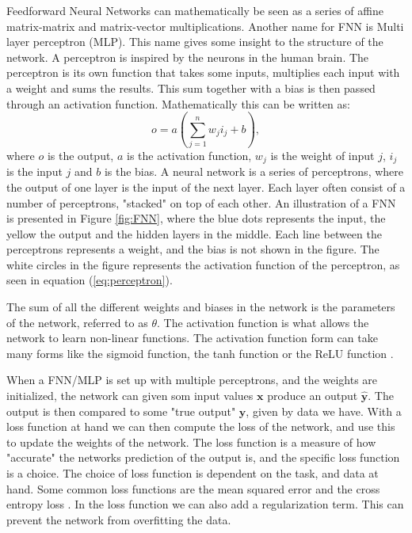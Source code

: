 Feedforward Neural Networks can mathematically be seen as a series of 
affine matrix-matrix and matrix-vector multiplications. Another name for FNN is
Multi layer perceptron (MLP). This name gives some insight to the structure of the
network. A perceptron is inspired by the neurons in the human brain. The perceptron
is its own function that takes some inputs, multiplies each input with a weight and
sums the results. This sum together with a bias is then passed through an activation function.
Mathematically this can be written as:
\begin{equation}
    o = a(\sum_{j=1}^{n} w_j i_j + b),
    \label{eq:perceptron}
\end{equation}
where $o$ is the output, $a$ is the activation function, $w_j$ is the weight of input $j$, $i_j$ is the input $j$ and $b$ is the bias.
A neural network is a series of perceptrons, where the output of one layer is the input of the next layer.
Each layer often consist of a number of perceptrons, "stacked" on top of each other.
An illustration of a FNN is presented in Figure \ref{fig:FNN}, where the blue dots represents the input, the yellow the output and the hidden layers in the middle.
Each line between the perceptrons represents a weight, and the bias is not shown in the figure. The white 
circles in the figure represents the activation function of the perceptron, as seen in equation (\ref{eq:perceptron}).

The sum of all the different weights and biases in the network is the parameters of the network, 
referred to as $\theta$. The activation function is what allows the network to learn non-linear functions.
The activation function form can take many forms like the sigmoid function, the tanh function or the ReLU function \cite{Goodfellow-et-al-2016}.

When a FNN/MLP is set up with multiple perceptrons, and the weights are initialized,
the network can given som input values $\textbf{x}$ produce an output $\hat{\textbf{y}}$.
The output is then compared to some "true output" $\textbf{y}$, given by data we have.
With a loss function at hand we can then compute the loss of the network, and use this to update the weights of the network.
The loss function is a measure of how "accurate" the networks prediction of the output is,
and the specific loss function is a choice. The choice of loss function is dependent on the task,
and data at hand. Some common loss functions are the mean squared error and the cross entropy loss \cite{Goodfellow-et-al-2016}.
In the loss function we can also add a regularization term. This can prevent the network from overfitting the data.

